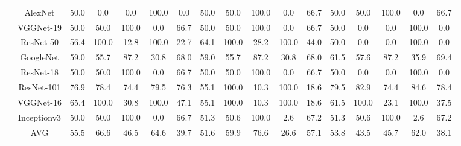 \documentclass[12pt,italian]{article}
\begin{document}
\begin{tiny}
\begin{longtable}{lcccccccccccccccc}
& AlexNet & 50.0 &  0.0 &  0.0 & 100.0 &  0.0 & 50.0 & 50.0 & 100.0 &  0.0 & 66.7 & 50.0 & 50.0 & 100.0 &  0.0 & 66.7 \\ 
& VGGNet-19 & 50.0 & 50.0 & 100.0 &  0.0 & 66.7 & 50.0 & 50.0 & 100.0 &  0.0 & 66.7 & 50.0 &  0.0 &  0.0 & 100.0 &  0.0 \\ 
& ResNet-50 & 56.4 & 100.0 & 12.8 & 100.0 & 22.7 & 64.1 & 100.0 & 28.2 & 100.0 & 44.0 & 50.0 &  0.0 &  0.0 & 100.0 &  0.0 \\ 
& GoogleNet & 59.0 & 55.7 & 87.2 & 30.8 & 68.0 & 59.0 & 55.7 & 87.2 & 30.8 & 68.0 & 61.5 & 57.6 & 87.2 & 35.9 & 69.4 \\ 
& ResNet-18 & 50.0 & 50.0 & 100.0 &  0.0 & 66.7 & 50.0 & 50.0 & 100.0 &  0.0 & 66.7 & 50.0 &  0.0 &  0.0 & 100.0 &  0.0 \\ 
& ResNet-101 & 76.9 & 78.4 & 74.4 & 79.5 & 76.3 & 55.1 & 100.0 & 10.3 & 100.0 & 18.6 & 79.5 & 82.9 & 74.4 & 84.6 & 78.4 \\ 
& VGGNet-16 & 65.4 & 100.0 & 30.8 & 100.0 & 47.1 & 55.1 & 100.0 & 10.3 & 100.0 & 18.6 & 61.5 & 100.0 & 23.1 & 100.0 & 37.5 \\ 
& Inceptionv3 & 50.0 & 50.0 & 100.0 &  0.0 & 66.7 & 51.3 & 50.6 & 100.0 &  2.6 & 67.2 & 51.3 & 50.6 & 100.0 &  2.6 & 67.2 \\ 
\hline
& AVG & 55.5 & 66.6 & 46.5 & 64.6 & 39.7 & 51.6 & 59.9 & 76.6 & 26.6 & 57.1 & 53.8 & 43.5 & 45.7 & 62.0 & 38.1 \\ 
\hline
\bottomrule
\end{longtable} 

 \pagebreak 
\end{tiny} 
 
\end{document}
